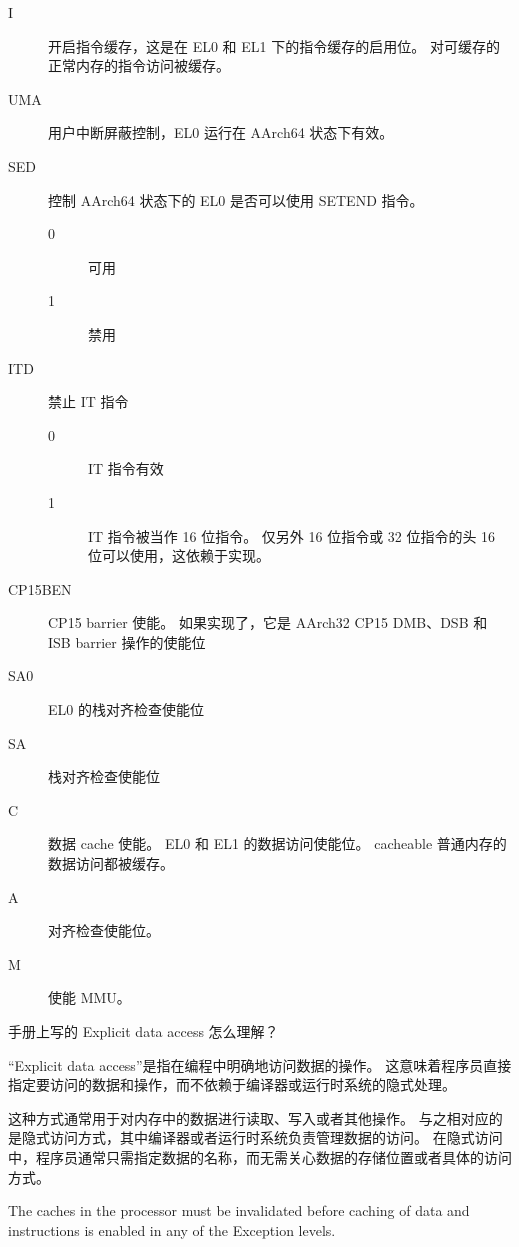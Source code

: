 \begin{description}
  \item[I] 开启指令缓存，这是在 EL0 和 EL1 下的指令缓存的启用位。
    对可缓存的正常内存的指令访问被缓存。
  \item[UMA] 用户中断屏蔽控制，EL0 运行在 AArch64 状态下有效。
  \item[SED] 控制 AArch64 状态下的 EL0 是否可以使用 SETEND 指令。
    \begin{description}
      \item[0] 可用
      \item[1] 禁用
    \end{description}
  \item[ITD] 禁止 IT 指令
    \begin{description}
      \item[0] IT 指令有效
      \item[1] IT 指令被当作 16 位指令。
        仅另外 16 位指令或 32 位指令的头 16 位可以使用，这依赖于实现。
    \end{description}
  \item[CP15BEN] CP15 barrier 使能。
    如果实现了，它是 AArch32 CP15 DMB、DSB 和 ISB barrier 操作的使能位
  \item[SA0] EL0 的栈对齐检查使能位
  \item[SA] 栈对齐检查使能位
  \item[C] 数据 cache 使能。
    EL0 和 EL1 的数据访问使能位。
    cacheable 普通内存的数据访问都被缓存。
  \item[A] 对齐检查使能位。
  \item[M] 使能 MMU。
\end{description}

\begin{probsolu}[title={Problem and Solution \theprob}]{
    手册上写的 Explicit data access 怎么理解？}

  “Explicit data access”是指在编程中明确地访问数据的操作。
  这意味着程序员直接指定要访问的数据和操作，而不依赖于编译器或运行时系统的隐式处理。

  这种方式通常用于对内存中的数据进行读取、写入或者其他操作。
  与之相对应的是隐式访问方式，其中编译器或者运行时系统负责管理数据的访问。
  在隐式访问中，程序员通常只需指定数据的名称，而无需关心数据的存储位置或者具体的访问方式。

\end{probsolu}

\begin{remark}
  The caches in the processor must be invalidated before caching of data and instructions is
enabled in any of the Exception levels.
\end{remark}

